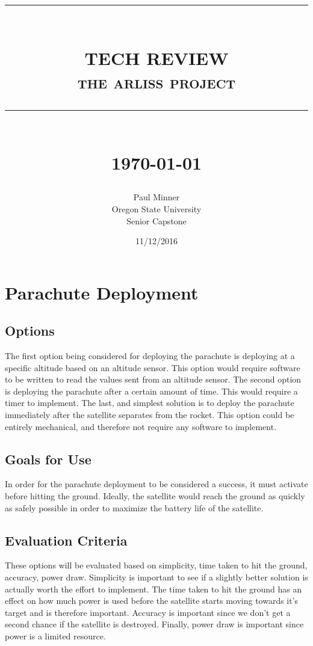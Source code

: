 \documentclass[10pt,serif,draftclsnofoot,onecolumn]{IEEEtran}
\newcommand{\HRule}[1]{\rule{\linewidth}{#1}}
\begin{document}
\begin{titlepage}
  \title{ \normalsize \textsc{}
    \\ [2.0cm]
    \HRule{0.5pt} \\
    \LARGE \textbf{\uppercase{Tech Review}}
    \\ \normalsize \textsc{the arliss project}
    \HRule{2pt} \\ [0.5cm]
    \normalsize \today \vspace*{5\baselineskip}}
  \date{11/12/2016}
  
  \author{Paul Minner \\
    Oregon State University \\
    Senior Capstone}
  \maketitle
\end{titlepage}

\newpage
{}

\section{Parachute Deployment}

\subsection{Options}
The first option being considered for deploying the parachute is deploying at a specific altitude based on an altitude sensor. This option would require software to be written to read the values sent from an altitude sensor. The second option is deploying the parachute after a certain amount of time. This would require a timer to implement. The last, and simplest solution is to deploy the parachute immediately after the satellite separates from the rocket. This option could be entirely mechanical, and therefore not require any software to implement.
\subsection{Goals for Use}
In order for the parachute deployment to be considered a success, it must activate before hitting the ground. Ideally, the satellite would reach the ground as quickly as safely possible in order to maximize the battery life of the satellite.
\subsection{Evaluation Criteria}
These options will be evaluated based on simplicity, time taken to hit the ground, accuracy, power draw. Simplicity is important to see if a slightly better solution is actually worth the effort to implement. The time taken to hit the ground has an effect on how much power is used before the satellite starts moving towards it’s target and is therefore important. Accuracy is important since we don’t get a second chance if the satellite is destroyed. Finally, power draw is important since power is a limited resource.
\end{document}
